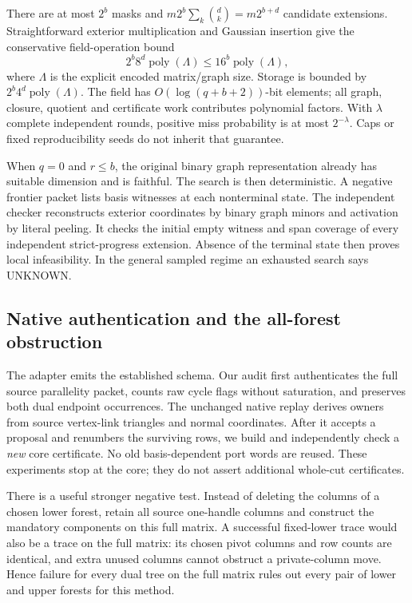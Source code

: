 There are at most $2^b$ masks and
$m2^b\sum_k\binom dk=m2^{b+d}$ candidate extensions.  Straightforward
exterior multiplication and Gaussian insertion give the conservative
field-operation bound
\[
  2^b8^d\operatorname{poly}(\Lambda)\leq
  16^b\operatorname{poly}(\Lambda),
\]
where $\Lambda$ is the explicit encoded matrix/graph size.  Storage is
bounded by $2^b4^d\operatorname{poly}(\Lambda)$.  The field has
$O(\log(q+b+2))$-bit elements; all graph, closure, quotient and certificate
work contributes polynomial factors.  With $\lambda$ complete independent
rounds, positive miss probability is at most $2^{-\lambda}$.  Caps or
fixed reproducibility seeds do not inherit that guarantee.

When $q=0$ and $r\leq b$, the original binary graph representation already
has suitable dimension and is faithful.  The search is then deterministic.
A negative frontier packet lists basis witnesses at each nonterminal state.
The independent checker reconstructs exterior coordinates by binary graph
minors and activation by literal peeling.  It checks the initial empty
witness and span coverage of every independent strict-progress extension.
Absence of the terminal state then proves local infeasibility.  In the
general sampled regime an exhausted search says UNKNOWN.

\subsection{Native authentication and the all-forest obstruction}

The adapter emits the established
 schema.  Our audit first authenticates
the full source parallelity packet, counts raw cycle flags without
saturation, and preserves both dual endpoint occurrences.  The unchanged
native replay derives owners from source vertex-link triangles and normal
coordinates.  After it accepts a proposal and renumbers the surviving
rows, we build and independently check a \emph{new} core certificate.
No old basis-dependent port words are reused.  These experiments stop at
the core; they do not assert additional whole-cut certificates.

There is a useful stronger negative test.  Instead of deleting the columns
of a chosen lower forest, retain all source one-handle columns and construct
the mandatory components on this full matrix.  A successful fixed-lower
trace would also be a trace on the full matrix: its chosen pivot columns
and row counts are identical, and extra unused columns cannot obstruct
a private-column move.  Hence failure for every dual tree on the full
matrix rules out every pair of lower and upper forests for this method.

